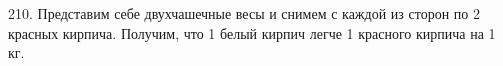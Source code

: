 210. Представим себе двухчашечные весы и снимем с каждой из сторон по 2 красных кирпича. Получим, что 1 белый кирпич легче 1 красного кирпича на 1 кг.\\

